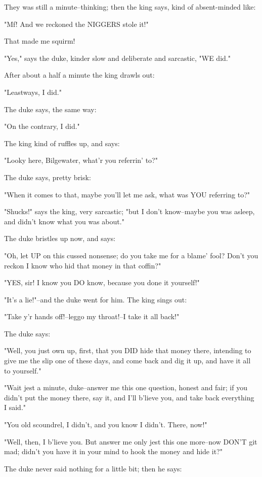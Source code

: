 They was still a minute--thinking; then the king says, kind of
absent-minded like:

"Mf!  And we reckoned the NIGGERS stole it!"

That made me squirm!

"Yes," says the duke, kinder slow and deliberate and sarcastic, "WE did."

After about a half a minute the king drawls out:

"Leastways, I did."

The duke says, the same way:

"On the contrary, I did."

The king kind of ruffles up, and says:

"Looky here, Bilgewater, what'r you referrin' to?"

The duke says, pretty brisk:

"When it comes to that, maybe you'll let me ask, what was YOU referring
to?"

"Shucks!" says the king, very sarcastic; "but I don't know--maybe you was
asleep, and didn't know what you was about."

The duke bristles up now, and says:

"Oh, let UP on this cussed nonsense; do you take me for a blame' fool?
Don't you reckon I know who hid that money in that coffin?"

"YES, sir!  I know you DO know, because you done it yourself!"

"It's a lie!"--and the duke went for him.  The king sings out:

"Take y'r hands off!--leggo my throat!--I take it all back!"

The duke says:

"Well, you just own up, first, that you DID hide that money there,
intending to give me the slip one of these days, and come back and dig it
up, and have it all to yourself."

"Wait jest a minute, duke--answer me this one question, honest and fair;
if you didn't put the money there, say it, and I'll b'lieve you, and take
back everything I said."

"You old scoundrel, I didn't, and you know I didn't.  There, now!"

"Well, then, I b'lieve you.  But answer me only jest this one more--now
DON'T git mad; didn't you have it in your mind to hook the money and hide
it?"

The duke never said nothing for a little bit; then he says:

